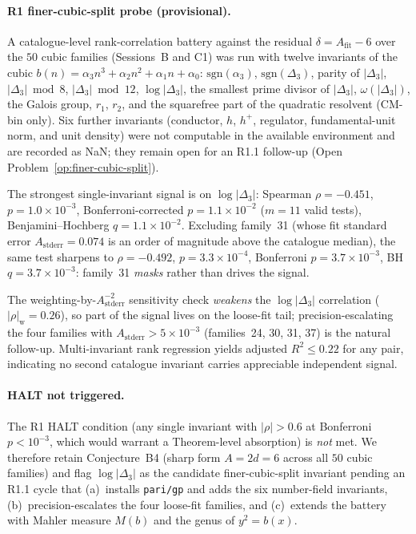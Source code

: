 \documentclass[11pt,a4paper]{article}
\theoremstyle{definition}
\theoremstyle{remark}
\begin{document}
\paragraph{R1 finer-cubic-split probe (provisional).}
A catalogue-level rank-correlation battery against the residual
$\delta = A_{\mathrm{fit}} - 6$ over the $50$ cubic families
(Sessions~B and C1) was run with twelve invariants of the cubic
$b(n) = \alpha_3 n^3 + \alpha_2 n^2 + \alpha_1 n + \alpha_0$:
$\mathrm{sgn}(\alpha_3)$, $\mathrm{sgn}(\Delta_3)$, parity of
$|\Delta_3|$, $|\Delta_3| \bmod 8$, $|\Delta_3| \bmod 12$,
$\log|\Delta_3|$, the smallest prime divisor of $|\Delta_3|$,
$\omega(|\Delta_3|)$, the Galois group, $r_1$, $r_2$, and the
squarefree part of the quadratic resolvent (CM-bin only). Six further
invariants (conductor, $h$, $h^+$, regulator, fundamental-unit norm,
and unit density) were not computable in the available environment
and are recorded as NaN; they remain open for an R1.1 follow-up
(Open Problem~\ref{op:finer-cubic-split}).

The strongest single-invariant signal is on $\log|\Delta_3|$:
Spearman $\rho = -0.451$, $p = 1.0\times 10^{-3}$,
Bonferroni-corrected $p = 1.1\times 10^{-2}$ ($m=11$ valid tests),
Benjamini--Hochberg $q = 1.1\times 10^{-2}$. Excluding family~31
(whose fit standard error $A_{\mathrm{stderr}}=0.074$ is an order of
magnitude above the catalogue median), the same test sharpens to
$\rho=-0.492$, $p=3.3\times 10^{-4}$, Bonferroni
$p=3.7\times 10^{-3}$, BH $q=3.7\times 10^{-3}$: family~31
\emph{masks} rather than drives the signal.

The weighting-by-$A_{\mathrm{stderr}}^{-2}$ sensitivity check
\emph{weakens} the $\log|\Delta_3|$ correlation
($|\rho|_{\mathrm{w}}=0.26$), so part of the signal lives on the
loose-fit tail; precision-escalating the four families with
$A_{\mathrm{stderr}}>5\times 10^{-3}$ (families~24, 30, 31, 37) is
the natural follow-up. Multi-invariant rank regression yields
adjusted $R^2\le 0.22$ for any pair, indicating no second catalogue
invariant carries appreciable independent signal.

\paragraph{HALT not triggered.}
The R1 HALT condition (any single invariant with $|\rho|>0.6$ at
Bonferroni $p<10^{-3}$, which would warrant a Theorem-level
absorption) is \emph{not} met. We therefore retain Conjecture~B4
(sharp form $A=2d=6$ across all $50$ cubic families) and flag
$\log|\Delta_3|$ as the candidate finer-cubic-split invariant pending
an R1.1 cycle that (a)~installs \texttt{pari/gp} and adds the six
number-field invariants, (b)~precision-escalates the four loose-fit
families, and (c)~extends the battery with Mahler measure $M(b)$ and
the genus of $y^2=b(x)$.
\end{document}
